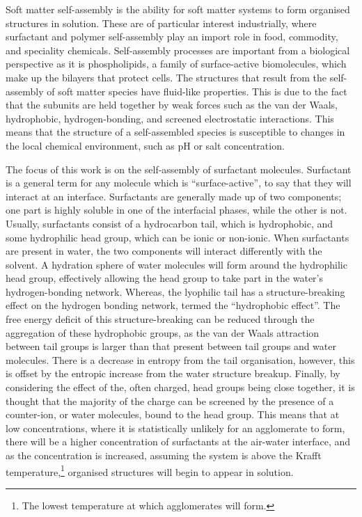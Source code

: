 Soft matter self-assembly is the ability for soft matter systems to form organised structures in solution.
These are of particular interest industrially, where surfactant and polymer self-assembly play an import role in food, commodity, and speciality chemicals.\autocite{schramm_surfactants_2003}
Self-assembly processes are important from a biological perspective as it is phospholipids, a family of surface-active biomolecules, which make up the bilayers that protect cells.\autocite{simons_lipid_2000}
The structures that result from the self-assembly of soft matter species have fluid-like properties.
This is due to the fact that the subunits are held together by weak forces such as the van der Waals, hydrophobic, hydrogen-bonding, and screened electrostatic interactions.\autocite{israelachvili_intermolecular_2011}
This means that the structure of a self-assembled species is susceptible to changes in the local chemical environment, such as pH or salt concentration.\autocite{schmaljohann_thermo-_2006,sammalkorpi_ionic_2009}

The focus of this work is on the self-assembly of surfactant molecules.
Surfactant is a general term for any molecule which is ``surface-active'', to say that they will interact at an interface.\autocite{rosen_surfactants_2012}
Surfactants are generally made up of two components; one part is highly soluble in one of the interfacial phases, while the other is not.\autocite{goodwin_colloids_2009}
Usually, surfactants consist of a hydrocarbon tail, which is hydrophobic, and some hydrophilic head group, which can be ionic or non-ionic.
When surfactants are present in water, the two components will interact differently with the solvent.
A hydration sphere of water molecules will form around the hydrophilic head group, effectively allowing the head group to take part in the water's hydrogen-bonding network.
Whereas, the lyophilic tail has a structure-breaking effect on the hydrogen bonding network, termed the ``hydrophobic effect''.
The free energy deficit of this structure-breaking can be reduced through the aggregation of these hydrophobic groups, as the van der Waals attraction between tail groups is larger than that present between tail groups and water molecules.
There is a decrease in entropy from the tail organisation, however, this is offset by the entropic increase from the water structure breakup.
Finally, by considering the effect of the, often charged, head groups being close together, it is thought that the majority of the charge can be screened by the presence of a counter-ion, or water molecules, bound to the head group.\autocite{goodwin_colloids_2009}
This means that at low concentrations, where it is statistically unlikely for an agglomerate to form, there will be a higher concentration of surfactants at the air-water interface, and as the concentration is increased, assuming the system is above the Krafft temperature,\footnote{The lowest temperature at which agglomerates will form.} organised structures will begin to appear in solution.

